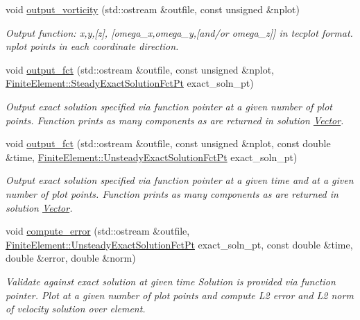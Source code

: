 \begin{DoxyCompactItemize}
void \hyperlink{classoomph_1_1SphericalNavierStokesEquations_aa3c32bb2312a5bc8be5b164fb1631dac}{output\+\_\+vorticity} (std\+::ostream \&outfile, const unsigned \&nplot)
\begin{DoxyCompactList}\small\item\em Output function\+: x,y,\mbox{[}z\mbox{]}, \mbox{[}omega\+\_\+x,omega\+\_\+y,\mbox{[}and/or omega\+\_\+z\mbox{]}\mbox{]} in tecplot format. nplot points in each coordinate direction. \end{DoxyCompactList}\item 
void \hyperlink{classoomph_1_1SphericalNavierStokesEquations_aa273df1ad9fe7cebb284bdae8b7e1a21}{output\+\_\+fct} (std\+::ostream \&outfile, const unsigned \&nplot, \hyperlink{classoomph_1_1FiniteElement_a690fd33af26cc3e84f39bba6d5a85202}{Finite\+Element\+::\+Steady\+Exact\+Solution\+Fct\+Pt} exact\+\_\+soln\+\_\+pt)
\begin{DoxyCompactList}\small\item\em Output exact solution specified via function pointer at a given number of plot points. Function prints as many components as are returned in solution \hyperlink{classoomph_1_1Vector}{Vector}. \end{DoxyCompactList}\item 
void \hyperlink{classoomph_1_1SphericalNavierStokesEquations_ad7e8436cec2be7afaa2f0a3ad0a38ec9}{output\+\_\+fct} (std\+::ostream \&outfile, const unsigned \&nplot, const double \&time, \hyperlink{classoomph_1_1FiniteElement_ad4ecf2b61b158a4b4d351a60d23c633e}{Finite\+Element\+::\+Unsteady\+Exact\+Solution\+Fct\+Pt} exact\+\_\+soln\+\_\+pt)
\begin{DoxyCompactList}\small\item\em Output exact solution specified via function pointer at a given time and at a given number of plot points. Function prints as many components as are returned in solution \hyperlink{classoomph_1_1Vector}{Vector}. \end{DoxyCompactList}\item 
void \hyperlink{classoomph_1_1SphericalNavierStokesEquations_a0d404ca488e2d464e1b21269431e6dad}{compute\+\_\+error} (std\+::ostream \&outfile, \hyperlink{classoomph_1_1FiniteElement_ad4ecf2b61b158a4b4d351a60d23c633e}{Finite\+Element\+::\+Unsteady\+Exact\+Solution\+Fct\+Pt} exact\+\_\+soln\+\_\+pt, const double \&time, double \&error, double \&norm)
\begin{DoxyCompactList}\small\item\em Validate against exact solution at given time Solution is provided via function pointer. Plot at a given number of plot points and compute L2 error and L2 norm of velocity solution over element. \end{DoxyCompactList}\item 

\end{DoxyCompactItemize}
